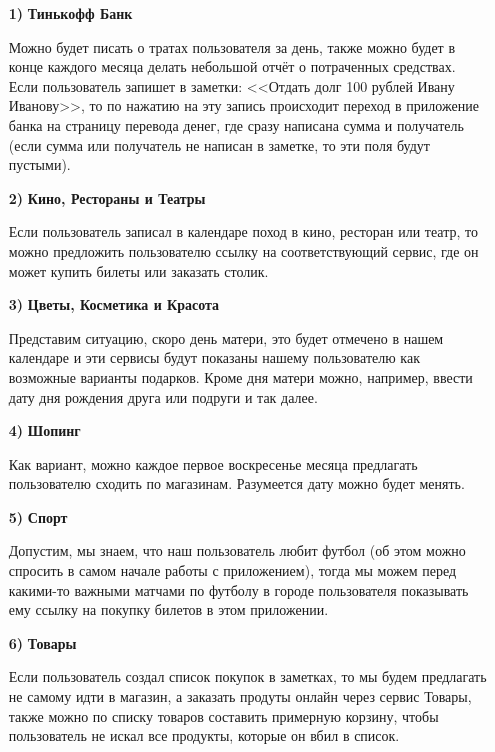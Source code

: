 \documentclass[a4paper,12pt]{article} %
\begin{document}
\begin{enumerate}

\item[\textbf{1)}] \textbf{Тинькофф Банк}

Можно будет писать о тратах пользователя за день, также можно будет в конце каждого месяца делать небольшой отчёт о потраченных средствах. Если пользователь запишет в заметки: <<Отдать долг 100 рублей Ивану Иванову>>, то по нажатию на эту запись происходит переход в приложение банка на страницу перевода денег, где сразу написана сумма и получатель (если сумма или получатель не написан в заметке, то эти поля будут пустыми).

\item[\textbf{2)}] \textbf{Кино, Рестораны и Театры}

Если пользователь записал в календаре поход в кино, ресторан или театр, то можно предложить пользователю ссылку на соответствующий сервис, где он может купить билеты или заказать столик.

\item[\textbf{3)}] \textbf{Цветы, Косметика и Красота}

Представим ситуацию, скоро день матери, это будет отмечено в нашем календаре и эти сервисы будут показаны нашему пользователю как возможные варианты подарков. Кроме дня матери можно, например, ввести дату дня рождения друга или подруги и так далее.

\item[\textbf{4)}] \textbf{Шопинг}

Как вариант, можно каждое первое воскресенье месяца предлагать пользователю сходить по магазинам. Разумеется дату можно будет менять.

\item[\textbf{5)}] \textbf{Спорт}

Допустим, мы знаем, что наш пользователь любит футбол (об этом можно спросить в самом начале работы с приложением), тогда мы можем перед какими-то важными матчами по футболу в городе пользователя показывать ему ссылку на покупку билетов в этом приложении.

\item[\textbf{6)}] \textbf{Товары}

Если пользователь создал список покупок в заметках, то мы будем предлагать не самому идти в магазин, а заказать продуты онлайн через сервис Товары, также можно по списку товаров составить примерную корзину, чтобы пользователь не искал все продукты, которые он вбил в список. 

\end{enumerate}
\end{document}
